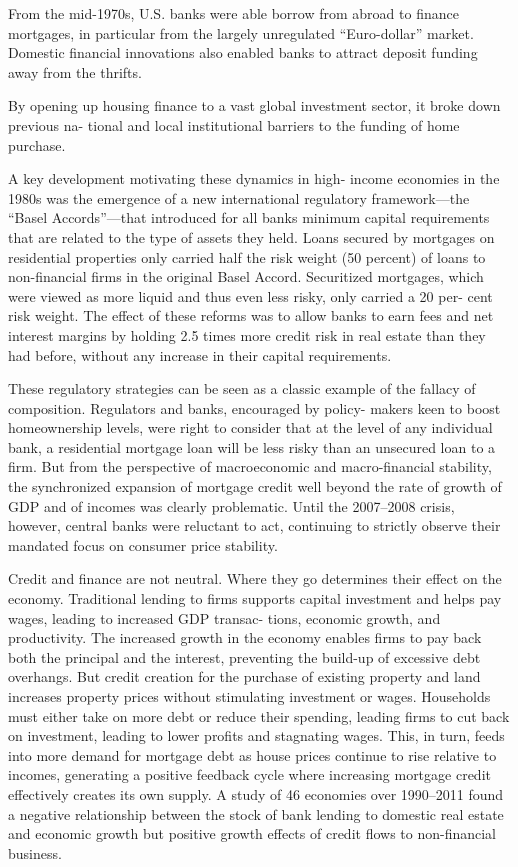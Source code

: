 \documentclass[
]{book}
\begin{document}
From the mid-­1970s,
U.S. banks were able borrow from abroad to finance mortgages, in
particular from the largely unregulated ``Euro-­dollar'' market. Domestic
financial innovations also enabled banks to attract deposit funding
away from the thrifts.

By opening up housing
finance to a vast global investment sector, it broke down previous na-
tional and local institutional barriers to the funding of home purchase.

A key development motivating these dynamics in high-­
income
economies in the 1980s was the emergence of a new international
regulatory framework---­the ``Basel Accords''---­that introduced for all
banks minimum capital requirements that are related to the type of
assets they held. Loans secured by mortgages on residential properties
only carried half the risk weight (50 percent) of loans to non-­financial
firms in the original Basel Accord. Securitized mortgages, which were
viewed as more liquid and thus even less risky, only carried a 20 per-
cent risk weight. The effect of these reforms was to allow banks to
earn fees and net interest margins by holding 2.5 times more credit
risk in real estate than they had before, without any increase in their
capital requirements.

These regulatory strategies can be seen as a classic example of the
fallacy of composition. Regulators and banks, encouraged by policy-
makers keen to boost homeownership levels, were right to consider
that at the level of any individual bank, a residential mortgage loan
will be less risky than an unsecured loan to a firm. But from the
perspective of macroeconomic and macro-­financial stability, the synchronized
expansion of mortgage credit well beyond the rate of growth of
GDP and of incomes was clearly problematic. Until the 2007--­2008
crisis, however, central banks were reluctant to act, continuing to strictly
observe their mandated focus on consumer price stability.

Credit and finance are not neutral. Where they go determines their
effect on the economy. Traditional lending to firms supports capital
investment and helps pay wages, leading to increased GDP transac-
tions, economic growth, and productivity. The increased growth in the
economy enables firms to pay back both the principal and the interest,
preventing the build-­up of excessive debt overhangs. But credit
creation for the purchase of existing property and land increases
property prices without stimulating investment or wages.
Households
must either take on more debt or reduce their spending, leading firms
to cut back on investment, leading to lower profits and stagnating
wages. This, in turn, feeds into more demand for mortgage debt as
house prices continue to rise relative to incomes, generating a
positive feedback cycle where increasing mortgage credit effectively
creates its own supply.
A study of 46
economies over 1990--­2011 found a negative relationship between the
stock of bank lending to domestic real estate and economic growth
but positive growth effects of credit flows to non-­financial business.
\end{document}
